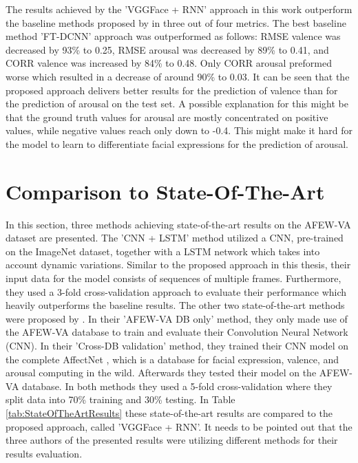 \noindent The results achieved by the 'VGGFace + RNN' approach in this work outperform the baseline methods proposed by \citet{Kossaifi:2017:AFEW-VADatabase} in three out of four metrics. The best baseline method 'FT-DCNN' \citep{Kossaifi:2017:AFEW-VADatabase} approach was outperformed as follows: RMSE valence was decreased by 93\% to 0.25, RMSE arousal was decreased by 89\% to 0.41, and CORR valence was increased by 84\% to 0.48. Only CORR arousal preformed worse which resulted in a decrease of around 90\% to 0.03. 
\newline\newline
It can be seen that the proposed approach delivers better results for the prediction of valence than for the prediction of arousal on the test set. A possible explanation for this might be that the ground truth values for arousal are mostly concentrated on positive values, while negative values reach only down to -0.4. This might make it hard for the model to learn to differentiate facial expressions for the prediction of arousal.

\section{Comparison to State-Of-The-Art} \label{sec:StateOfTheArtComparison}
In this section, three methods achieving state-of-the-art results on the AFEW-VA dataset are presented. The 'CNN + LSTM' \citep{Theagarajan:2018:DeepDriver} method utilized a CNN, pre-trained on the ImageNet dataset, together with a LSTM network which takes into account dynamic variations. Similar to the proposed approach in this thesis, their input data for the model consists of sequences of multiple frames. Furthermore, they used a 3-fold cross-validation approach to evaluate their performance which heavily outperforms the baseline results.
\newline\newline
The other two state-of-the-art methods were proposed by \citet{Handrich:2020:SimultaneousPredVA}. In their 'AFEW-VA DB only' \citep{Handrich:2020:SimultaneousPredVA} method, they only made use of the AFEW-VA database to train and evaluate their Convolution Neural Network (CNN). In their 'Cross-DB validation' \citep{Handrich:2020:SimultaneousPredVA} method, they trained their CNN model on the complete AffectNet \citep{Mollahosseini:2019:AffectNet}, which is a database for facial expression, valence, and arousal computing in the wild. Afterwards they tested their model on the AFEW-VA database. In both methods they used a 5-fold cross-validation where they split data into 70\% training and 30\% testing.
\newline\newline
In Table \ref{tab:StateOfTheArtResults} these state-of-the-art results are compared to the proposed approach, called 'VGGFace + RNN'. It needs to be pointed out that the three authors of the presented results were utilizing different methods for their results evaluation.

